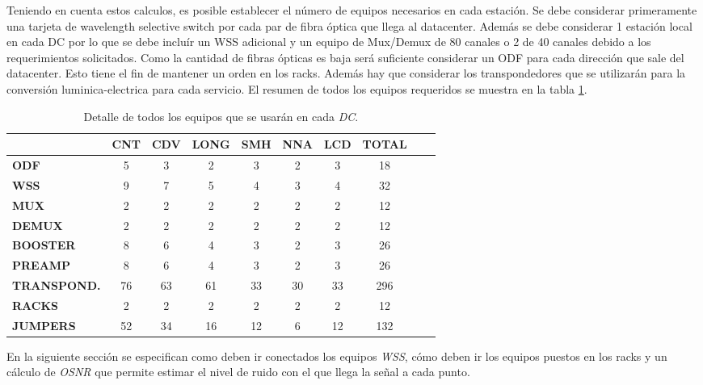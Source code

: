 Teniendo en cuenta estos calculos, es posible establecer el número de equipos necesarios en cada estación. Se debe considerar primeramente una tarjeta de wavelength selective switch por cada par de fibra óptica que llega al datacenter. Además se debe considerar 1 estación local en cada DC por lo que se debe incluír un WSS adicional y un equipo de Mux/Demux de 80 canales o 2 de 40 canales debido a los requerimientos solicitados. Como la cantidad de fibras ópticas es baja será suficiente considerar un ODF para cada dirección que sale del datacenter. Esto tiene el fin de mantener un orden en los racks. Además hay que considerar los transpondedores que se utilizarán para la conversión luminica-electrica para cada servicio. El resumen de todos los equipos requeridos se muestra en la tabla \ref{tab:resumen}.

\begin{table}[!hbt]
\centering
\begin{tabular}{||l | c | c | c | c | c | c | c | c | c ||}
\hline
\hline 
& \textbf{CNT} & \textbf{CDV} & \textbf{LONG} & \textbf{SMH} & \textbf{NNA} & \textbf{LCD} & \textbf{TOTAL} \\ \hline
\textbf{ODF} & 5 & 3 & 2 & 3 & 2 & 3 & 18 \\
\hline
\textbf{WSS} & 9 & 7 & 5 & 4 & 3 & 4 & 32 \\
\hline
\textbf{MUX} & 2 & 2 & 2 & 2 & 2 & 2 & 12 \\
\hline
\textbf{DEMUX} & 2 & 2 & 2 & 2 & 2 & 2 & 12 \\
\hline
\textbf{BOOSTER} & 8 & 6 & 4 & 3 & 2 & 3 & 26 \\
\hline
\textbf{PREAMP} & 8 & 6 & 4 & 3 & 2 & 3 & 26 \\
\hline
\textbf{TRANSPOND.} & 76 & 63 & 61 & 33 & 30 & 33 & 296 \\
\hline
\textbf{RACKS} & 2 & 2 & 2 & 2 & 2 & 2 & 12 \\
\hline
\textbf{JUMPERS} & 52 & 34 & 16 & 12 & 6 & 12 & 132 \\
\hline
\end{tabular}
\caption[Total de Equipos necesarios]{Detalle de todos los equipos que se usarán en cada \emph{DC}.}
\label{tab:resumen}
\end{table}

En la siguiente sección se especifican como deben ir conectados los equipos \emph{WSS}, cómo deben ir los equipos puestos en los racks y un cálculo de \emph{OSNR} que permite estimar el nivel de ruido con el que llega la señal a cada punto.
